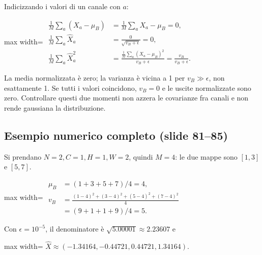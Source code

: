 \documentclass[11pt,a4paper,oneside,openany]{book}
\begin{document}
Indicizzando i valori di un canale con \(a\):

\begin{center}
\begin{adjustbox}{max width=\linewidth}
$\displaystyle 
\begin{aligned}
\frac1M\sum_a(X_a-\mu_B)&=\frac1M\sum_aX_a-\mu_B=0,\\
\frac1M\sum_a\widehat X_a&=\frac{0}{\sqrt{v_B+\epsilon}}=0,\\
\frac1M\sum_a\widehat X_a^2&=\frac{\frac1M\sum_a(X_a-\mu_B)^2}{v_B+\epsilon}
=\frac{v_B}{v_B+\epsilon}.
\end{aligned}
$
\end{adjustbox}
\end{center}

La media normalizzata è zero; la varianza è vicina a 1 per \(v_B\gg\epsilon\), non esattamente 1. Se tutti i valori coincidono, \(v_B=0\) e le uscite normalizzate sono zero. Controllare questi due momenti non azzera le covarianze fra canali e non rende gaussiana la distribuzione.

\subsection{Esempio numerico completo (slide 81--85)}\label{f02-r1187}

Si prendano \(N=2,C=1,H=1,W=2\), quindi \(M=4\): le due mappe sono \([1,3]\) e \([5,7]\).

\begin{center}
\begin{adjustbox}{max width=\linewidth}
$\displaystyle 
\begin{aligned}
\mu_B&=(1+3+5+7)/4=4,\\
v_B&=\frac{(1-4)^2+(3-4)^2+(5-4)^2+(7-4)^2}{4}\\
&=(9+1+1+9)/4=5.
\end{aligned}
$
\end{adjustbox}
\end{center}

Con \(\epsilon=10^{-5}\), il denominatore è \(\sqrt{5.00001}\approx2.23607\) e

\begin{center}
\begin{adjustbox}{max width=\linewidth}
$\displaystyle \widehat X\approx(-1.34164,-0.44721,0.44721,1.34164).$
\end{adjustbox}
\end{center}
\end{document}
